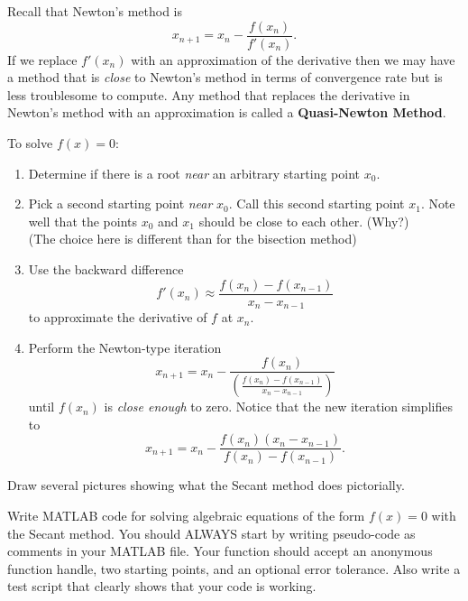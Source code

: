 Recall that Newton's method is
\[ x_{n+1} = x_n - \frac{f(x_n)}{f'(x_n)}. \]
If we replace $f'(x_n)$ with an approximation of the derivative then we may have a method
that is {\it close} to Newton's method in terms of convergence rate but is less
troublesome to compute. Any method that replaces the derivative in Newton's method with an
approximation is called a {\bf Quasi-Newton Method}.

\begin{algorithm}
    To solve $f(x) = 0$:
    \begin{enumerate}
        \item Determine if there is a root {\it near} an arbitrary starting point $x_0$.
        \item Pick a second starting point {\it near} $x_0$.  Call this second starting
            point $x_1$. Note well that the points $x_0$ and
            $x_1$ should be close to each other. (Why?)\\ (The choice here is different than for
            the bisection method)
        \item Use the backward difference 
            \[ f'(x_n) \approx \frac{f(x_n) - f(x_{n-1})}{x_n - x_{n-1}} \]
            to approximate the derivative of $f$ at $x_n$.
        \item Perform the Newton-type iteration 
            \[ x_{n+1} = x_n - \frac{f(x_n)}{ \left(  \frac{f(x_n) - f(x_{n-1})}{x_n - x_{n-1}}\right)} \]
            until $f(x_n)$ is {\it close enough} to zero.  Notice that the new iteration
            simplifies to
            \[ x_{n+1} = x_n - \frac{f(x_n)\left( x_n - x_{n-1} \right)}{f(x_n) -
            f(x_{n-1})}. \]
    \end{enumerate}
\end{algorithm}

\begin{problem}
    Draw several pictures showing what the Secant method does pictorially.
\end{problem}

\begin{problem}
    Write MATLAB code for solving algebraic equations of the form $f(x) = 0$ with the
    Secant method.  You should ALWAYS start by writing pseudo-code as comments in your
    MATLAB file.   Your function should accept an anonymous function handle, two starting
    points, and an optional error tolerance.  Also write a test script that clearly shows that your code is working.
    \\
\end{problem}

